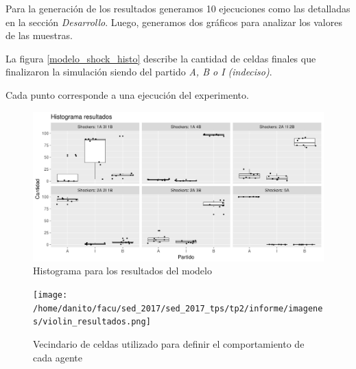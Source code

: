 Para la generación de los resultados generamos 10 ejecuciones como las detalladas en la sección \textit{Desarrollo}.
Luego, generamos dos gráficos para analizar los valores de las muestras.

La figura \ref{modelo_shock_histo} describe la cantidad de celdas finales que
finalizaron la simulación siendo del partido \textit{A, B o I (indeciso)}.

Cada punto corresponde a una ejecución del experimento.



\begin{figure}[!h]
\centering
\includegraphics[scale=0.5]{imagenes/histograma_resultados.png}
\caption{Histograma para los resultados del modelo}
\label{fig:modelo_shock_histo}
\end{figure}

\begin{figure}[!h]
\centering
\texttt{[image: /home/danito/facu/sed\_2017/sed\_2017\_tps/tp2/informe/imagenes/violin\_resultados.png]}
\caption{Vecindario de celdas utilizado para definir el comportamiento de cada agente}
\label{fig:modelo_shock_violin}
\end{figure}
